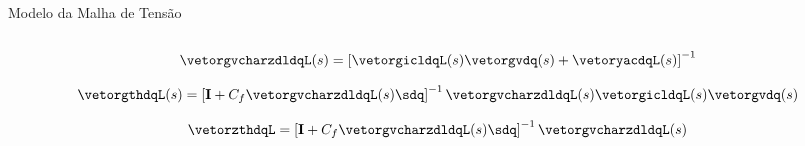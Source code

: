\begin{frame}{Modelo da Malha de Tensão}
\begin{columns}
\end{columns}


\vspace*{0.5cm}

\begin{equation*}
\vetorgvcharzdldqL(s) = 
\left[
\vetorgicldqL(s) \vetorgvdq(s)
+\vetoryacdqL(s)
\right]^{-1} 
\end{equation*}


\begin{equation*}
\vetorgthdqL(s) = 
\left[ 
\mathbf{I} +
C_f \vetorgvcharzdldqL(s) \sdq 
\right]^{-1}
\vetorgvcharzdldqL(s) \vetorgicldqL(s) \vetorgvdq(s)
\end{equation*}

\begin{equation*}
\vetorzthdqL = 
\left[ 
\mathbf{I} +
C_f \vetorgvcharzdldqL(s) \sdq 
\right]^{-1}
\vetorgvcharzdldqL(s)
\end{equation*}

\end{frame}





